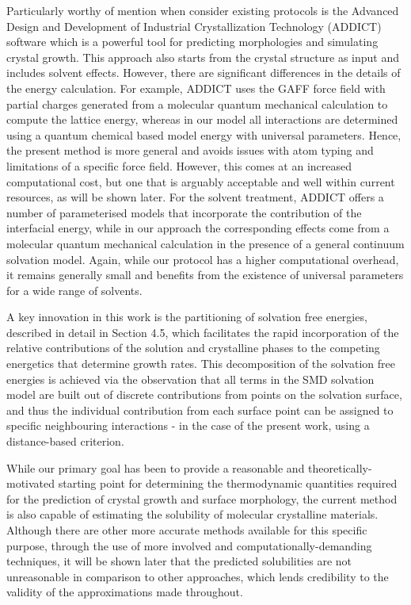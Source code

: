 \documentclass[twoside,twocolumn,9pt]{article}
\begin{document}
Particularly worthy of mention when consider existing protocols is the Advanced Design and Development of Industrial Crystallization Technology (ADDICT)\cite{Zhao2020} software which is a powerful tool for predicting morphologies and simulating crystal growth. This approach also starts
from the crystal structure as input and includes solvent effects. However, there are significant differences in the details of the energy 
calculation. For example, ADDICT uses the GAFF force field \cite{Wang2004} with partial charges generated from a molecular quantum mechanical
calculation to compute the lattice energy, whereas in our
model all interactions are determined using a quantum chemical based model energy with 
universal parameters. Hence, the present method is more general and avoids issues with atom typing and limitations of a specific force field. However, this comes at an increased computational cost, but one that is arguably acceptable and well within current resources, as will be shown later. 
For the solvent treatment, ADDICT offers a number of parameterised models that incorporate the contribution of the interfacial energy, while in our approach the corresponding effects come from a molecular quantum mechanical calculation in the presence of a general continuum solvation model. Again, while our protocol has a higher computational overhead, it remains generally small and benefits from the existence of universal parameters for a wide range of solvents.


A key innovation in this work is the partitioning of solvation free energies, described in detail in Section 4.5, which facilitates the rapid incorporation of the relative contributions of the solution and crystalline phases to the competing energetics that determine growth rates. 
This decomposition of the solvation free energies is achieved via the observation that all terms in the SMD solvation model are built out of discrete contributions from points on the solvation surface, and thus the individual contribution from each surface point can be assigned to specific neighbouring interactions - in the case of the present work, using a distance-based criterion.


While our primary goal has been to provide a reasonable and theoretically-motivated starting point for determining the thermodynamic quantities required for the prediction of crystal growth and surface morphology, the current method is also capable of estimating the solubility of molecular crystalline materials. Although there are other more accurate methods available for this specific purpose, through the use of more involved 
and computationally-demanding techniques,\cite{Palmer2008} it will be shown later that the predicted solubilities are not unreasonable in comparison to other approaches, which lends credibility to the validity of the approximations made throughout.
\end{document}
